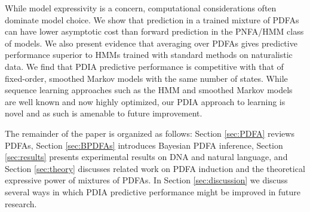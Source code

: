 While model expressivity is a concern, computational considerations often dominate model choice.  We show that prediction in a trained mixture of PDFAs can have lower asymptotic cost than forward prediction in the PNFA/HMM class of models.  We also present evidence that averaging over PDFAs gives predictive performance superior to HMMs trained with standard methods on naturalistic data.  We find that PDIA predictive performance is competitive with that of fixed-order, smoothed Markov models with the same number of states.  While sequence learning approaches such as the HMM and smoothed Markov models are well known and now highly optimized, our PDIA approach to learning is novel and as such is amenable to future improvement.  

The remainder of the paper is organized as follows:  Section \ref{sec:PDFA} reviews PDFAs, Section \ref{sec:BPDFAs} introduces Bayesian PDFA inference, Section \ref{sec:results} presents experimental results on DNA and natural language, and Section \ref{sec:theory} discusses related work on PDFA induction and the theoretical expressive power of mixtures of PDFAs.
In Section \ref{sec:discussion} we discuss several ways in which PDIA predictive performance might be improved in future research.

